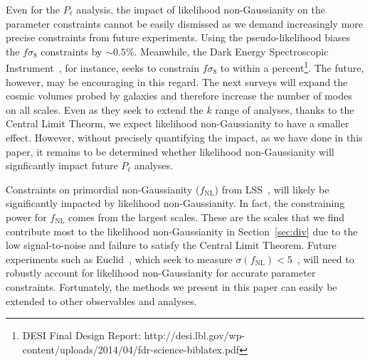 \documentclass[12pt, letterpaper, preprint]{aastex6}
\newcommand{\lss}{{\small{LSS}}\xspace}
\begin{document}
Even for the $P_\ell$ analysis, the impact of likelihood non-Gaussianity 
on the parameter constraints cannot be easily dismissed as we demand 
increasingly more precise constraints from future experiments. Using the 
pseudo-likelihood biases the $f\sigma_8$ constraints by $\sim 0.5\%$. 
Meanwhile, the Dark Energy Spectroscopic Instrument~\citep[DESI;][]{levi2013}, 
for instance, seeks to constrain $f\sigma_8$ to within a 
percent\footnote{DESI Final Design Report: http://desi.lbl.gov/wp-content/uploads/2014/04/fdr-science-biblatex.pdf}. 
The future, however, may be encouraging in this regard. The next surveys 
will expand the cosmic volumes probed by galaxies and therefore increase 
the number of modes on all scales. Even as they seek to extend the $k$ 
range of analyses, thanks to the Central Limit Theorm, we expect 
likelihood non-Gaussianity to have a smaller effect. However, without 
precisely quantifying the impact, as we have done in this paper, it 
remains to be determined whether likelihood non-Gaussianity will signficantly 
impact future $P_\ell$ analyses.  

Constraints on primordial non-Gaussianity ($f_\mathrm{NL}$) from \lss~\citep[\emph{e.g.}][]{dalal2008, slosar2008, ross2013, giannantonio2014}, 
will likely be significantly impacted by likelihood non-Gaussianity. 
{\color{red} In fact, the constraining power for $f_\mathrm{NL}$ comes from the 
largest scales. These are the scales that we find contribute most to the 
likelihood non-Gaussianity in Section~\ref{sec:div} due to the low signal-to-noise 
and failure to satisfy the Central Limit Theorem.}
Future experiments such as Euclid~\citep{amendola2016}, which seek 
to measure $\sigma(f_\mathrm{NL}) < 5$~\citep{giannantonio2012, amendola2016}, 
will need to robustly account for likelihood non-Gaussianity for 
accurate parameter constraints. Fortunately, the methods we present 
in this paper can easily be extended to other observables and analyses. 
\end{document}
